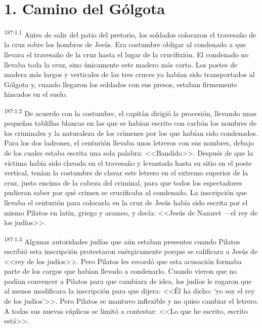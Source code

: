\section*{1. Camino del Gólgota}
\par 
\textsuperscript{187:1.1} Antes de salir del patio del pretorio, los soldados colocaron el travesaño de la cruz sobre los hombros de Jesús. Era costumbre obligar al condenado a que llevara el travesaño de la cruz hasta el lugar de la crucifixión. El condenado no llevaba toda la cruz, sino únicamente este madero más corto. Los postes de madera más largos y verticales de las tres cruces ya habían sido transportados al Gólgota y, cuando llegaron los soldados con sus presos, estaban firmemente hincados en el suelo.

\par 
\textsuperscript{187:1.2} De acuerdo con la costumbre, el capitán dirigió la procesión, llevando unas pequeñas tablillas blancas en las que se habían escrito con carbón los nombres de los criminales y la naturaleza de los crímenes por los que habían sido condenados. Para los dos ladrones, el centurión llevaba unos letreros con sus nombres, debajo de los cuales estaba escrita una sola palabra: <<Bandido>>. Después de que la víctima había sido clavada en el travesaño y levantada hasta su sitio en el poste vertical, tenían la costumbre de clavar este letrero en el extremo superior de la cruz, justo encima de la cabeza del criminal, para que todos los espectadores pudieran saber por qué crimen se crucificaba al condenado. La inscripción que llevaba el centurión para colocarla en la cruz de Jesús había sido escrita por el mismo Pilatos en latín, griego y arameo, y decía: <<Jesús de Nazaret ---el rey de los judíos>>.

\par 
\textsuperscript{187:1.3} Algunas autoridades judías que aún estaban presentes cuando Pilatos escribió esta inscripción protestaron enérgicamente porque se calificara a Jesús de <<rey de los judíos>>. Pero Pilatos les recordó que esta acusación formaba parte de los cargos que habían llevado a condenarlo. Cuando vieron que no podían convencer a Pilatos para que cambiara de idea, los judíos le rogaron que al menos modificara la inscripción para que dijera: <<Él ha dicho: `yo soy el rey de los judíos'>>. Pero Pilatos se mantuvo inflexible y no quiso cambiar el letrero. A todas sus nuevas súplicas se limitó a contestar: <<Lo que he escrito, escrito está>>.

